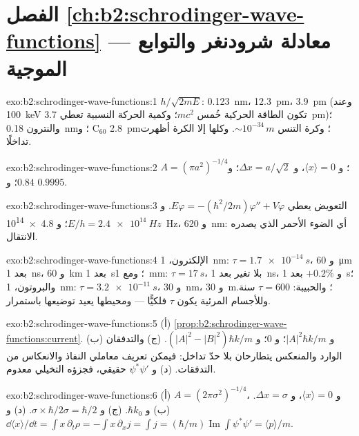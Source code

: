 \section*{الفصل \ref{ch:b2:schrodinger-wave-functions} --- معادلة شرودنغر والتوابع الموجية}

\begin{solution}{exo:b2:schrodinger-wave-functions:1}
$h/\sqrt{2mE}$: \qty{0.123}{nm}، \qty{12.3}{pm}، \qty{3.9}{pm} (وعند \qty{100}{keV} تكون
الطاقة الحركية خُمس $mc^2$؛ وكمية الحركة النسبية تعطي
\qty{3.7}{pm})؛ والنترون \qty{0.18}{nm}؛ و C$_{60}$ \qty{2.8}{pm}؛ وكرة التنس
$\sim 10^{-34}\,\unit{m}$. وكلها إلا الكرة أظهرت تداخلًا.
\end{solution}

\begin{solution}{exo:b2:schrodinger-wave-functions:2}
$A = (\pi a^2)^{-1/4}$؛ و $\langle x\rangle = 0$، و $\Delta x = a/\sqrt2$؛ و $0.84$؛ و $0.9995$.
\end{solution}

\begin{solution}{exo:b2:schrodinger-wave-functions:3}
التعويض يعطي $E\varphi = -(\hbar^2/2m)\varphi'' + V\varphi$. و $E/h =
\qty{2.4e14}{Hz}$؛ و \qty{4.8e14}{Hz}، و \qty{620}{nm}: أي الضوء الأحمر الذي يصدره
الانتقال.
\end{solution}

\begin{solution}{exo:b2:schrodinger-wave-functions:4}
الإلكترون، \qty{1}{nm}: $\tau = \qty{1.7e-14}{s}$، و \qty{60}{\micro m} بعد \qty{1}{ns}،
و \qty{60}{km} بعد \qty{1}{s}؛ ومع \qty{1}{mm}: $\tau = \qty{17}{s}$، بلا تغير بعد \qty{1}{ns}،
و $+0.2\%$ بعد \qty{1}{s}؛ والبروتون، \qty{1}{nm}: $\tau = \qty{3.2e-11}{s}$، و \qty{30}{nm}،
و \qty{30}{m}؛ والحبيبة: $\tau = 600$ سنة. وللأجسام المرئية يكون $\tau$
فلكيًّا --- ومحيطها يعيد توضيعها باستمرار.
\end{solution}

\begin{solution}{exo:b2:schrodinger-wave-functions:5}
(أ) \cref{prop:b2:schrodinger-wave-functions:current}. (ب) و $|A|^2\hbar k/m$؛
و $0$؛ و $(|A|^2 - |B|^2)\hbar k/m$. (ج) والتدفقان الوارد والمنعكس
يتطارحان بلا حدّ تداخل: فيمكن تعريف معاملي النفاذ
والانعكاس من التدفقات. (د) و $\psi^*\psi'$ حقيقي، فجزؤه
التخيلي معدوم.
\end{solution}

\begin{solution}{exo:b2:schrodinger-wave-functions:6}
(أ) $A = (2\pi\sigma^2)^{-1/4}$، و $\langle x\rangle = 0$، و $\Delta x = \sigma$. (ب) و $\hbar k_0$.
(ج) و $\sigma \times \hbar/2\sigma = \hbar/2$. (د) و $\dd\langle x\rangle/\dd t = \int x\,
\partial_t\rho = -\int x\,\partial_xj = \int j = (\hbar/m)\operatorname{Im}\int\psi^*
\psi' = \langle p\rangle/m$.
\end{solution}


